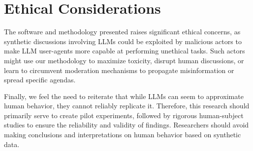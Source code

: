 %
\section{Ethical Considerations}
\label{sec:ethical}

The software and methodology presented raises significant ethical concerns, as synthetic discussions involving \acp{LLM} could be exploited by malicious actors to make \ac{LLM} user-agents more capable at performing unethical tasks. Such actors might use our methodology to  maximize toxicity, disrupt human discussions, or learn to circumvent moderation mechanisms to propagate misinformation or spread specific agendas. 

Finally, we feel the need to reiterate that while \acp{LLM} can seem to approximate human behavior, they cannot reliably replicate it. Therefore, this research should primarily serve to create pilot experiments, followed by rigorous human-subject studies to ensure the reliability and validity of findings. Researchers should avoid making conclusions and interpretations on human behavior based on synthetic data.